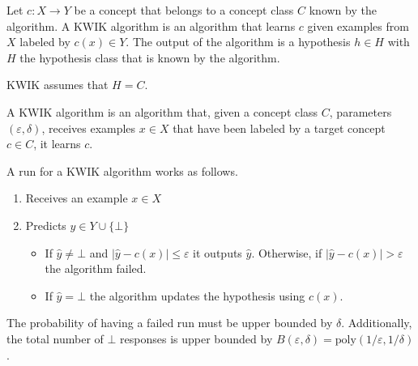 Let $c: X \rightarrow Y$ be a concept that belongs to a concept class $C$ known by the algorithm.
A KWIK algorithm is an algorithm that learns $c$ given examples from $X$ labeled by $c(x) \in Y$. The output of the algorithm is a hypothesis $h \in H$ with $H$ the hypothesis class that is known by the algorithm.

KWIK assumes that $H=C$.

A KWIK algorithm is an algorithm that, given a concept class $C$, parameters $(\varepsilon, \delta)$,  receives examples $x \in X$ that have been labeled by a target concept $c \in C$, it learns $c$.

A run for a KWIK algorithm works as follows.
\begin{enumerate}
  \item Receives an example $x \in X$
  \item Predicts $\hat{y} \in Y \cup \{\bot\}$
    \begin{itemize}
      \item If $\hat{y} \neq \bot$ and $|\hat{y} - c(x)| \leq \varepsilon$ it outputs $\hat{y}$. Otherwise, if $|\hat{y} - c(x)| > \varepsilon$ the algorithm failed.
      \item If $\hat{y} = \bot$ the algorithm updates the hypothesis using $c(x)$.
    \end{itemize}
\end{enumerate}

The probability of having a failed run must be upper bounded by $\delta$. Additionally, the total number of $\bot$ responses is upper bounded by $B(\varepsilon,\delta)=\text{poly}(1/\varepsilon,1/\delta)$.
